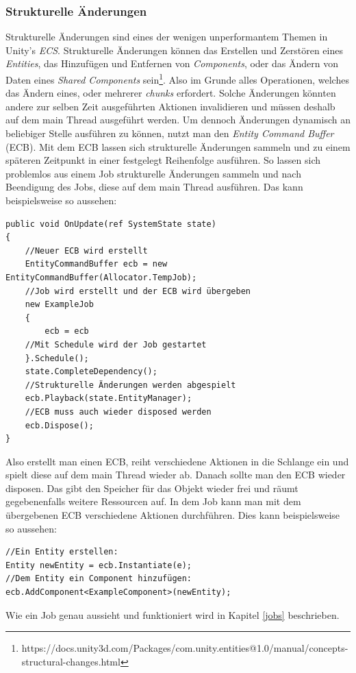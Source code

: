 \subsubsection{Strukturelle Änderungen}\label{structuralChanges}
Strukturelle Änderungen sind eines der wenigen unperformantem Themen in Unity's \textit{ECS}. Strukturelle Änderungen können das Erstellen und Zerstören eines \textit{Entities}, das Hinzufügen und Entfernen von \textit{Components}, oder das Ändern von Daten eines \textit{Shared Components} sein\footnote{https://docs.unity3d.com/Packages/com.unity.entities@1.0/manual/concepts-structural-changes.html}. Also im Grunde alles Operationen, welches das Ändern eines, oder mehrerer \textit{chunks} erfordert. Solche Änderungen könnten andere zur selben Zeit ausgeführten Aktionen invalidieren und müssen deshalb auf dem main Thread ausgeführt werden. Um dennoch Änderungen dynamisch an beliebiger Stelle ausführen zu können, nutzt man den \textit{Entity Command Buffer} (ECB). Mit dem ECB lassen sich strukturelle Änderungen sammeln und zu einem späteren Zeitpunkt in einer festgelegt Reihenfolge ausführen. So lassen sich problemlos aus einem Job strukturelle Änderungen sammeln und nach Beendigung des Jobs, diese auf dem main Thread ausführen. Das kann beispielsweise so aussehen:
\begin{lstlisting}[style=code, caption={ECB Beispiel}]
public void OnUpdate(ref SystemState state)
{
    //Neuer ECB wird erstellt
    EntityCommandBuffer ecb = new EntityCommandBuffer(Allocator.TempJob);
    //Job wird erstellt und der ECB wird übergeben
    new ExampleJob
    {
        ecb = ecb
    //Mit Schedule wird der Job gestartet
    }.Schedule();
    state.CompleteDependency();
    //Strukturelle Änderungen werden abgespielt
    ecb.Playback(state.EntityManager);
    //ECB muss auch wieder disposed werden
    ecb.Dispose();
}
\end{lstlisting}
Also erstellt man einen ECB, reiht verschiedene Aktionen in die Schlange ein und spielt diese auf dem main Thread wieder ab. Danach sollte man den ECB wieder disposen. Das gibt den Speicher für das Objekt wieder frei und räumt gegebenenfalls weitere Ressourcen auf. In dem Job kann man mit dem übergebenen ECB verschiedene Aktionen durchführen. Dies kann beispielsweise so aussehen:
\begin{lstlisting}[style=code, caption={ECB Aktionen Beispiel}]
//Ein Entity erstellen:
Entity newEntity = ecb.Instantiate(e);
//Dem Entity ein Component hinzufügen:
ecb.AddComponent<ExampleComponent>(newEntity);
\end{lstlisting}
Wie ein Job genau aussieht und funktioniert wird in Kapitel \ref{jobs} beschrieben.